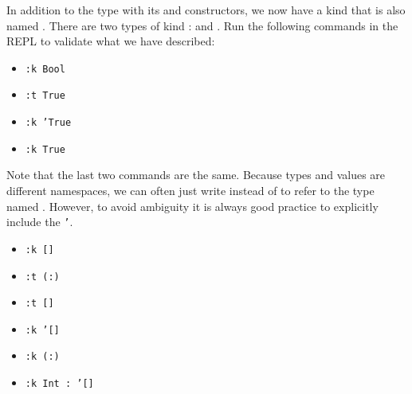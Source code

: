 In addition to the  type with its  and  constructors, we now have a kind that is also named . There are two types of kind :  and . Run the following commands in the REPL to validate what we have described:
\begin{itemize}
	\item \texttt{\small :k Bool} 
	\item \texttt{\small :t True} 
	\item \texttt{\small :k 'True} 
	\item \texttt{\small :k True} 
\end{itemize}
Note that the last two commands are the same. Because types and values are different namespaces, we can often just write  instead of  to refer to the type named . However, to avoid ambiguity it is always good practice to explicitly include the \texttt{'}.

\taskLine

\begin{itemize}
	\item \texttt{\small :k []}
	\item \texttt{\small :t (:)}
	\item \texttt{\small :t []}
	\item \texttt{\small :k '[]}
	\item \texttt{\small :k (:)}
	\item \texttt{\small :k Int :~'[]}
\end{itemize}
